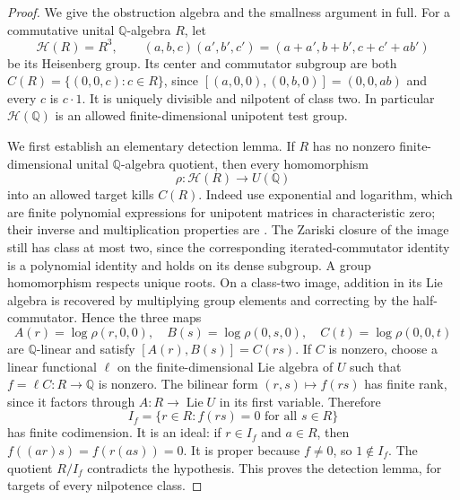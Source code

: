 \begin{proof}
We give the obstruction algebra and the smallness argument in full.
For a commutative unital $\mathbb Q$-algebra $R$, let
\[
 \mathcal H(R)=R^3,\qquad
 (a,b,c)(a',b',c')=(a+a',b+b',c+c'+ab')
                                                               \tag{H5.9.1}
\]
be its Heisenberg group. Its center and commutator subgroup are
both $C(R)=\{(0,0,c):c\in R\}$, since
$[(a,0,0),(0,b,0)]=(0,0,ab)$ and every $c$ is $c\cdot1$.
It is uniquely divisible and nilpotent of class two.
In particular $\mathcal H(\mathbb Q)$ is an allowed
finite-dimensional unipotent test group.

We first establish an elementary detection lemma. If $R$ has
no nonzero finite-dimensional unital $\mathbb Q$-algebra quotient,
then every homomorphism
\[
             \rho:\mathcal H(R)\longrightarrow U(\mathbb Q)
                                                               \tag{H5.9.2}
\]
into an allowed target kills $C(R)$. Indeed use exponential and
logarithm, which are finite polynomial expressions for unipotent
matrices in characteristic zero; their inverse and multiplication
properties are \citet[Propositions 14.32 and 14.36]{EH5Milne2022}.
The Zariski closure of the image still has class at most two,
since the corresponding iterated-commutator identity is a polynomial
identity and holds on its dense subgroup. A group homomorphism respects
unique roots. On a class-two image, addition in its Lie algebra
is recovered by multiplying group elements and correcting by the
half-commutator. Hence the three maps
\[
 A(r)=\log\rho(r,0,0),\quad B(s)=\log\rho(0,s,0),\quad
 C(t)=\log\rho(0,0,t)
\]
are $\mathbb Q$-linear and satisfy
$[A(r),B(s)]=C(rs)$.
If $C$ is nonzero, choose a linear functional $\ell$ on the
finite-dimensional Lie algebra of $U$ such that
$f=\ell C:R\to\mathbb Q$ is nonzero. The bilinear form
$(r,s)\mapsto f(rs)$ has finite rank, since it factors through
$A:R\to\operatorname{Lie}U$ in its first variable. Therefore
\[
              I_f=\{r\in R:f(rs)=0\text{ for all }s\in R\}
                                                               \tag{H5.9.3}
\]
has finite codimension. It is an ideal: if $r\in I_f$ and
$a\in R$, then $f((ar)s)=f(r(as))=0$. It is proper because
$f\ne0$, so $1\notin I_f$. The quotient $R/I_f$ contradicts
the hypothesis. This proves the detection lemma, for targets
of every nilpotence class.


\end{proof}
